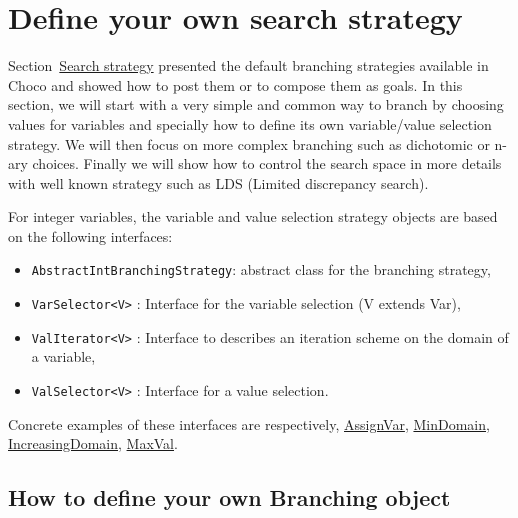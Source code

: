 \section{Define your own search strategy}\label{advanced:defineyourownsearchstrategy}\hypertarget{advanced:defineyourownsearchstrategy}{}
Section~\hyperlink{solver:searchstrategy}{Search strategy} presented the default branching strategies available in Choco and showed how to post them or to compose them as goals.
In this section, we will start with a very simple and common way to branch by choosing values for variables and specially how to define its own variable/value selection strategy. We will then focus on more complex branching such as dichotomic or n-ary choices. Finally we will show how to control the search space in more details with well known strategy such as LDS (Limited discrepancy search).

For integer variables, the variable and value selection strategy objects are based on the following interfaces:
\begin{itemize}
	\item \texttt{AbstractIntBranchingStrategy}: abstract class for the branching strategy,
	\item \texttt{VarSelector<V>} : Interface for the variable selection (V extends Var),
	\item \texttt{ValIterator<V>} : Interface to describes an iteration scheme on the domain of a variable,
	\item \texttt{ValSelector<V>} : Interface for a value selection.
\end{itemize}

Concrete examples of these interfaces are respectively,  \hyperlink{assignvar:assignvarbranchstrat}{AssignVar}, \hyperlink{mindomain:mindomainvarselector}{MinDomain}, \hyperlink{increasingdomain:increasingdomainvaliterator}{IncreasingDomain}, \hyperlink{maxval:maxvalvalselector}{MaxVal}.

\subsection{How to define your own Branching object}\label{advanced:beyondvariable/valueselection,howtodefineyourownbranchingobject}\hypertarget{advanced:beyondvariable/valueselection,howtodefineyourownbranchingobject}{}

